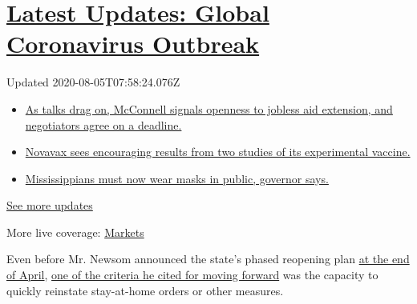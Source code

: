 \hypertarget{latest-updates-global-coronavirus-outbreak}{%
\section{\texorpdfstring{\href{https://www.nytimes.com/2020/08/04/world/coronavirus-cases.html?action=click\&pgtype=Article\&state=default\&region=MAIN_CONTENT_1\&context=storylines_live_updates}{Latest
Updates: Global Coronavirus
Outbreak}}{Latest Updates: Global Coronavirus Outbreak}}\label{latest-updates-global-coronavirus-outbreak}}

Updated 2020-08-05T07:58:24.076Z

\begin{itemize}
\tightlist
\item
  \href{https://www.nytimes.com/2020/08/04/world/coronavirus-cases.html?action=click\&pgtype=Article\&state=default\&region=MAIN_CONTENT_1\&context=storylines_live_updates\#link-762df92}{As
  talks drag on, McConnell signals openness to jobless aid extension,
  and negotiators agree on a deadline.}
\item
  \href{https://www.nytimes.com/2020/08/04/world/coronavirus-cases.html?action=click\&pgtype=Article\&state=default\&region=MAIN_CONTENT_1\&context=storylines_live_updates\#link-1228a480}{Novavax
  sees encouraging results from two studies of its experimental
  vaccine.}
\item
  \href{https://www.nytimes.com/2020/08/04/world/coronavirus-cases.html?action=click\&pgtype=Article\&state=default\&region=MAIN_CONTENT_1\&context=storylines_live_updates\#link-794484ed}{Mississippians
  must now wear masks in public, governor says.}
\end{itemize}

\href{https://www.nytimes.com/2020/08/04/world/coronavirus-cases.html?action=click\&pgtype=Article\&state=default\&region=MAIN_CONTENT_1\&context=storylines_live_updates}{See
more updates}

More live coverage:
\href{https://www.nytimes.com/live/2020/08/04/business/stock-market-today-coronavirus?action=click\&pgtype=Article\&state=default\&region=MAIN_CONTENT_1\&context=storylines_live_updates}{Markets}

Even before Mr. Newsom announced the state's phased reopening plan
\href{https://www.nytimes.com/2020/04/29/us/california-reopen-coronavirus.html}{at
the end of April},
\href{https://www.nytimes.com/2020/04/15/us/coronavirus-california-quarantine-end.html}{one
of the criteria he cited for moving forward} was the capacity to quickly
reinstate stay-at-home orders or other measures.

